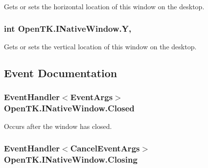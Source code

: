 Gets or sets the horizontal location of this window on the desktop. 

\hypertarget{interface_open_t_k_1_1_i_native_window_a7e5b77aadb970f82daabf0adedeb2b16}{
\subsubsection[{Y}]{\setlength{\rightskip}{0pt plus 5cm}int Open\-T\-K.\-I\-Native\-Window.\-Y\hspace{0.3cm}{\ttfamily [get]}, {\ttfamily [set]}}}\label{interface_open_t_k_1_1_i_native_window_a7e5b77aadb970f82daabf0adedeb2b16}


Gets or sets the vertical location of this window on the desktop. 



\subsection{Event Documentation}
\hypertarget{interface_open_t_k_1_1_i_native_window_a2ecfca5308b3f11c83ef15011f4a96de}{
\subsubsection[{Closed}]{\setlength{\rightskip}{0pt plus 5cm}Event\-Handler$<$Event\-Args$>$ Open\-T\-K.\-I\-Native\-Window.\-Closed}}\label{interface_open_t_k_1_1_i_native_window_a2ecfca5308b3f11c83ef15011f4a96de}


Occurs after the window has closed. 

\hypertarget{interface_open_t_k_1_1_i_native_window_a8404d9d6adb118c52c1e329e8a331d52}{
\subsubsection[{Closing}]{\setlength{\rightskip}{0pt plus 5cm}Event\-Handler$<$Cancel\-Event\-Args$>$ Open\-T\-K.\-I\-Native\-Window.\-Closing}}\label{interface_open_t_k_1_1_i_native_window_a8404d9d6adb118c52c1e329e8a331d52}


